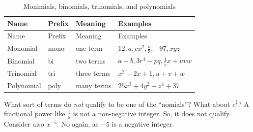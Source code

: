 \documentclass[
  a4paper,
]{article}
\begin{document}
\begin{longtable}[]{@{}
  >{\raggedright\arraybackslash}p{}
  >{\raggedright\arraybackslash}p{}
  >{\raggedright\arraybackslash}p{}
  >{\raggedright\arraybackslash}p{}@{}}
\caption{\label{tbl:nomials}Monimials, binomials, trinomials, and
polynomials}\tabularnewline
\toprule\noalign{}
\begin{minipage}[b]{\linewidth}\raggedright
Name
\end{minipage} & \begin{minipage}[b]{\linewidth}\raggedright
Prefix
\end{minipage} & \begin{minipage}[b]{\linewidth}\raggedright
Meaning
\end{minipage} & \begin{minipage}[b]{\linewidth}\raggedright
Examples
\end{minipage} \\
\midrule\noalign{}
\endfirsthead
\toprule\noalign{}
\begin{minipage}[b]{\linewidth}\raggedright
Name
\end{minipage} & \begin{minipage}[b]{\linewidth}\raggedright
Prefix
\end{minipage} & \begin{minipage}[b]{\linewidth}\raggedright
Meaning
\end{minipage} & \begin{minipage}[b]{\linewidth}\raggedright
Examples
\end{minipage} \\
\midrule\noalign{}
\endhead
\bottomrule\noalign{}
\endlastfoot
Monomial & mono & one term & \(12, a, cx^2, \frac{b}{3}, -97, xyz\) \\
Binomial & bi & two terms & \(a - b, 3r^4 - pq, \frac{1}{5}x + uvw\) \\
Trinomial & tri & three terms & \(x^2 - 2x + 1, u + v + w\) \\
Polynomial & poly & many terms & \(25x^3 + 4y^2 + z^4 + 37\) \\
\end{longtable}

What sort of terms do \emph{not} qualify to be one of the ``nomials''?
What about \(c^{\frac{1}{5}}\)? A fractional power like \(\frac{1}{5}\)
is not a non-negative integer. So, it does not qualify. Consider also
\(x^{-5}\). No again, as \(-5\) is a negative integer.
\end{document}
